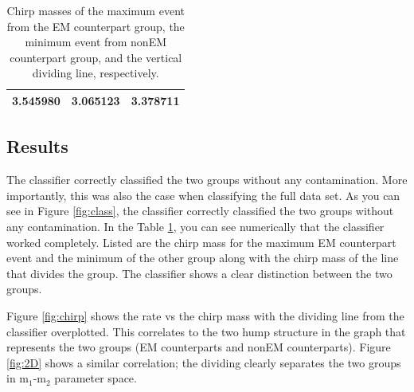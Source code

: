 \begin{table}[ht]
\caption{Chirp masses of the maximum event from the EM counterpart group, the minimum event from nonEM counterpart group, and the vertical dividing line, respectively.}
\centering
\begin{tabular}{c c c}
\hline\hline
3.545980 & 3.065123 & 3.378711\\
\hline\hline
\end{tabular}
\label{tab:mass}
\end{table}

\subsection{Results}
The classifier correctly classified the two groups without any contamination. More importantly, this was also the case when classifying the full data set. As you can see in Figure \ref{fig:class}, the classifier correctly classified the two groups without any contamination. In the Table \ref{tab:mass}, you can see numerically that the classifier worked completely. Listed are the chirp mass for the maximum EM counterpart event and the minimum of the other group along with the chirp mass of the line that divides the group. The classifier shows a clear distinction between the two groups.



Figure \ref{fig:chirp} shows the rate vs the chirp mass with the dividing line from the classifier overplotted. This correlates to the two hump structure in the graph that represents the two groups (EM counterparts and nonEM counterparts). Figure \ref{fig:2D} shows a similar correlation; the dividing clearly separates the two groups in  m$_{1}$-m$_{2}$ parameter space.